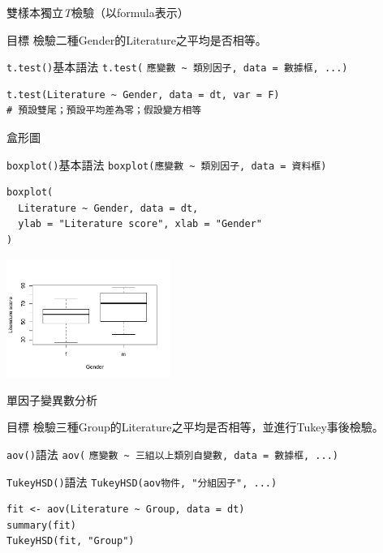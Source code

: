 \documentclass[12pt]{beamer}
\begin{document}
\begin{frame}[fragile]{雙樣本獨立\emph{T}檢驗（以formula表示）}
\begin{block}{目標}
檢驗二種Gender的Literature之平均是否相等。
\end{block}
\begin{block}{\texttt{t.test()}基本語法}
\verb+t.test(+
\verb+應變數 ~ 類別因子, data = 數據框, ...)+
\end{block}
\begin{verbatim}
t.test(Literature ~ Gender, data = dt, var = F)
# 預設雙尾；預設平均差為零；假設變方相等
\end{verbatim}
\end{frame}

\begin{frame}[fragile]{盒形圖}

\begin{block}{\texttt{boxplot()}基本語法}
\verb+boxplot(應變數 ~ 類別因子, data = 資料框)+
\end{block}

\begin{verbatim}
boxplot(
  Literature ~ Gender, data = dt, 
  ylab = "Literature score", xlab = "Gender"
)
\end{verbatim}

\begin{center}
\includegraphics[width=0.4\textwidth]{Rplot-two-group.pdf}
\end{center}
\end{frame}

\begin{frame}[fragile]{單因子變異數分析}
\begin{block}{目標}
檢驗三種Group的Literature之平均是否相等，並進行Tukey事後檢驗。
\end{block}

\begin{block}{\texttt{aov()}語法}
\verb+aov(+
\verb+應變數 ~ 三組以上類別自變數, data = 數據框, ...)+
\end{block}

\begin{block}{\texttt{TukeyHSD()}語法}
\verb+TukeyHSD(aov物件, "分組因子", ...)+
\end{block}

\begin{verbatim}
fit <- aov(Literature ~ Group, data = dt)
summary(fit)
TukeyHSD(fit, "Group")
\end{verbatim}

\end{frame}
\end{document}
